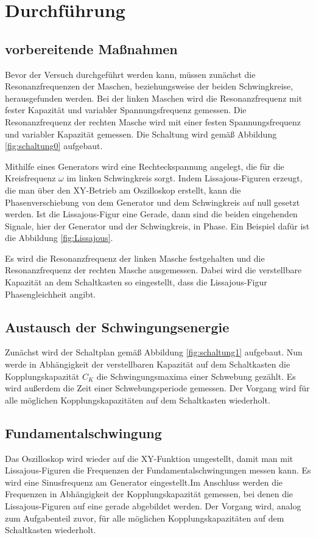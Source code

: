\section{Durchführung}
\label{sec:Durchführung}

\subsection{vorbereitende Maßnahmen}
Bevor der Versuch durchgeführt werden kann, müssen zunächst die Resonanzfrequenzen der Maschen, beziehungsweise der beiden Schwingkreise,
herausgefunden werden.
Bei der linken Maschen wird die Resonanzfrequenz mit fester Kapazität und variabler Spannungsfrequenz %
gemessen. Die Resonanzfrequenz der rechten Masche wird mit einer festen Spannungsfrequenz und variabler Kapazität  gemessen.
Die Schaltung wird gemäß Abbildung \ref{fig:schaltung0} aufgebaut. 

Mithilfe eines Generators wird eine Rechteckspannung angelegt, die  für die Kreisfrequenz $\omega$ im linken Schwingkreis sorgt. 
Indem Lissajous-Figuren erzeugt, die man über den XY-Betrieb am Oszilloskop erstellt, kann die Phasenverschiebung von dem Generator und 
dem Schwingkreis auf null gesetzt werden. Ist die Lissajous-Figur eine Gerade, dann sind die beiden eingehenden Signale, hier der
Generator und der Schwingkreis, in Phase. Ein Beispiel dafür ist die Abbildung \ref{fig:Lissajous}.

Es wird die Resonanzfrequenz der linken Masche festgehalten und die Resonanzfrequenz der rechten Masche ausgemessen.
Dabei wird die verstellbare Kapazität an dem Schaltkasten so eingestellt, dass die Lissajous-Figur Phasengleichheit angibt.

\subsection{Austausch der Schwingungsenergie}
Zunächst wird der Schaltplan gemäß Abbildung \ref{fig:schaltung1} aufgebaut. Nun werde in Abhängigkeit der verstellbaren Kapazität auf dem Schaltkasten
die Kopplungskapazität $C_K$ die Schwingungsmaxima einer Schwebung gezählt. Es wird außerdem die Zeit einer Schwebungsperiode gemessen.
Der Vorgang wird für alle möglichen Kopplungskapazitäten auf dem Schaltkasten wiederholt.

\subsection{Fundamentalschwingung}
Das Oszilloskop wird wieder auf die XY-Funktion umgestellt, damit man mit Lissajous-Figuren die Frequenzen der Fundamentalschwingungen messen kann. 
Es wird eine Sinusfrequenz am Generator eingestellt.Im Anschluss werden die Frequenzen in Abhängigkeit der Kopplungskapazität gemessen, bei denen 
die Lissajous-Figuren auf eine gerade abgebildet werden. Der Vorgang wird, analog zum Aufgabenteil zuvor, für alle möglichen Kopplungskapazitäten 
auf dem Schaltkasten wiederholt.

